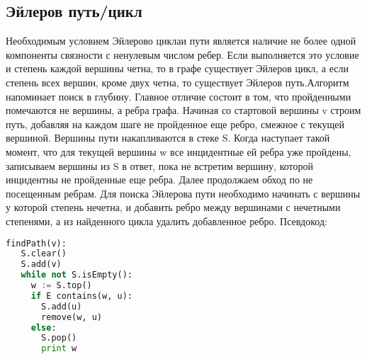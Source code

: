 \subsection{Эйлеров путь/цикл}
Необходимым условием Эйлерово циклаи пути является наличие не более одной компоненты связности с ненулевым числом ребер. Если выполняется это условие и степень каждой вершины четна, то в графе существует Эйлеров цикл, а если степень всех вершин, кроме двух четна, то существует Эйлеров путь.Алгоритм напоминает поиск в глубину. Главное отличие состоит в том, что пройденными помечаются не вершины, а ребра графа. Начиная со стартовой вершины v строим путь, добавляя на каждом шаге не пройденное еще ребро, смежное с текущей вершиной. Вершины пути накапливаются в стеке S. Когда наступает такой момент, что для текущей вершины w все инцидентные ей ребра уже пройдены, записываем вершины из S в ответ, пока не встретим вершину, которой инцидентны не пройденные еще ребра. Далее продолжаем обход по не посещенным ребрам. Для поиска Эйлерова пути необходимо начинать с вершины у которой степень нечетна, и добавить ребро между вершинами с нечетными степенями, а из найденного цикла удалить добавленное ребро. Псевдокод:
\begin{lstlisting}[language=Python]
findPath(v):
   S.clear()
   S.add(v)
   while not S.isEmpty():
     w := S.top()
     if E contains(w, u):
       S.add(u)
       remove(w, u)
     else:
       S.pop()
       print w
\end{lstlisting}

